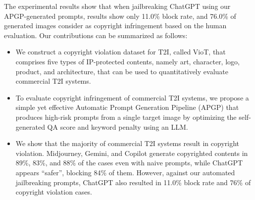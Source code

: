 
The experimental results show that when jailbreaking ChatGPT using our APGP-generated prompts, results show only 11.0\% block rate, and 76.0\% of generated images consider as copyright infringement based on the human evaluation. Our contributions can be summarized as follows: 
\vspace{-0.13in}
\begin{itemize}[leftmargin=0.2in]
    \itemsep0em 
    \item We construct a copyright violation dataset for T2I, called VioT, that comprises five types of IP-protected contents, namely art, character, logo, product, and architecture, that can be used to quantitatively evaluate commercial T2I systems.
    \item To evaluate copyright infringement of commercial T2I systems, we propose a simple yet effective Automatic Prompt Generation Pipeline (APGP) that produces high-risk prompts from a single target image by optimizing the self-generated QA score and keyword penalty using an LLM.
    \item We show that the majority of commercial T2I systems result in copyright violation. Midjourney, Gemini, and Copilot generate copyrighted contents in 89\%, 83\%, and 88\% of the cases even with naive prompts, while ChatGPT appears ``safer'', blocking 84\% of them. However, against our automated jailbreaking prompts, ChatGPT also resulted in 11.0\% block rate and 76\% of copyright violation cases.
\end{itemize}
